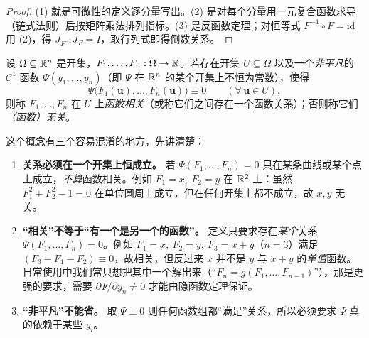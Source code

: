 \begin{proof}
(1) 就是可微性的定义逐分量写出。(2) 是对每个分量用一元复合函数求导（链式法则）后按矩阵乘法排列指标。(3) 是反函数定理；对恒等式 \(F^{-1}\circ F=\mathrm{id}\) 用 (2)，得 \(J_{F^{-1}}J_F=I\)，取行列式即得倒数关系。
\end{proof}

\begin{definition}[函数相关]
设 \(\Omega\subseteq\mathbb{R}^n\) 是开集，\(F_1,\dots,F_n:\Omega\to\mathbb{R}\)。若存在开集 \(U\subseteq\Omega\) 以及一个\emph{非平凡}的 \(\mathcal C^1\) 函数 \(\Psi(y_1,\dots,y_n)\)（即 \(\Psi\) 在 \(\mathbb{R}^n\) 的某个开集上不恒为常数），使得
\[
\Psi\bigl(F_1(\mathbf{u}),\dots,F_n(\mathbf{u})\bigr)\equiv0\qquad(\forall\,\mathbf{u}\in U),
\]
则称 \(F_1,\dots,F_n\) 在 \(U\) 上\emph{函数相关}（或称它们之间存在一个函数关系）；否则称它们\emph{（函数）无关}。
\end{definition}

\begin{remark}
这个概念有三个容易混淆的地方，先讲清楚：
\begin{enumerate}[label=(\arabic*)]
  \item \textbf{关系必须在一个开集上恒成立。} 若 \(\Psi(F_1,\dots,F_n)=0\) 只在某条曲线或某个点上成立，\emph{不算}函数相关。例如 \(F_1=x,\ F_2=y\) 在 \(\mathbb{R}^2\) 上：虽然 \(F_1^2+F_2^2-1=0\) 在单位圆周上成立，但在任何开集上都不成立，故 \(x,y\) 无关。
  \item \textbf{“相关”不等于“有一个是另一个的函数”。} 定义只要求存在\emph{某个}关系 \(\Psi(F_1,\dots,F_n)=0\)。例如 \(F_1=x,\ F_2=y,\ F_3=x+y\)（\(n=3\)）满足 \((F_3-F_1-F_2)\equiv0\)，故相关，但反过来 \(x\) 并不是 \(y\) 与 \(x+y\) 的\emph{单值}函数。日常使用中我们常只想把其中一个解出来（“\(F_n=g(F_1,\dots,F_{n-1})\)”），那是更强的要求，需要 \(\partial\Psi/\partial y_n\ne0\) 才能由隐函数定理保证。
  \item \textbf{“非平凡”不能省。} 取 \(\Psi\equiv0\) 则任何函数组都“满足”关系，所以必须要求 \(\Psi\) 真的依赖于某些 \(y_i\)。
\end{enumerate}
\end{remark}

